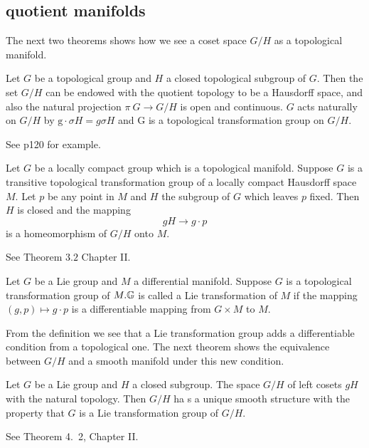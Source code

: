 \subsection{quotient manifolds}

The next two theorems shows how we see a coset space $G / H$ as a
topological manifold.

\begin{theorem}
	Let $G$ be a topological group and $H$ a closed topological
	subgroup of $G$. Then the set $G / H$ can be endowed
	with the quotient topology to be a Hausdorff space, and also
	the natural projection $\pi\: G \rightarrow G / H$ is open
	and continuous. $G$ acts naturally on $G / H$ by $\mathrm{g}
	\cdot {\sigma H}={g} \sigma {H}$ and $\mathrm{G}$ is a
	topological transformation group on ${G} /{H}$.
\end{theorem}
\bproof
See \cite{Hel} p120 for example. 
\eproof

\begin{theorem}
	Let $G$ be a locally compact group which is a topological
	manifold. Suppose $G$ is a transitive topological
	transformation group of a locally compact Hausdorff space
	$M$. Let $p$ be any point in $M$ and $H$ the subgroup of $G$
	which leaves $p$ fixed. Then ${H}$ is closed and the mapping
	\[
	g H \rightarrow g \cdot p
	\]
	is a homeomorphism of $G / H$ onto $M$.
\end{theorem}
\bproof
See \cite{Hel} Theorem $3.2$ Chapter II.
\eproof
\begin{definition}
	Let $G$ be a Lie group and $M$ a differential manifold.
	Suppose $G$ is a topological transformation group of $M .{\mathbb G}$ is
	called a Lie transformation of $M$ if the mapping $(g, p)
	\mapsto g \cdot p$ is a differentiable mapping from $G \times
	M$ to $M$.
\end{definition}

From the definition we see that a Lie transformation group adds a
differentiable condition from a topological one. The next theorem
shows the equivalence between $G / H$ and a smooth manifold under
this new condition.

\begin{theorem}
Let $G$ be a Lie group and $H$ a closed subgroup.  The space $G / H$
of left cosets $g H$ with the natural topology. Then $G / H$ ha
s a unique smooth structure with the property that $G$ is a Lie
transformation group of $G / H$.	
\end{theorem}
\bproof
See \cite{Hel} Theorem 4.\ 2, Chapter II.
\eproof

